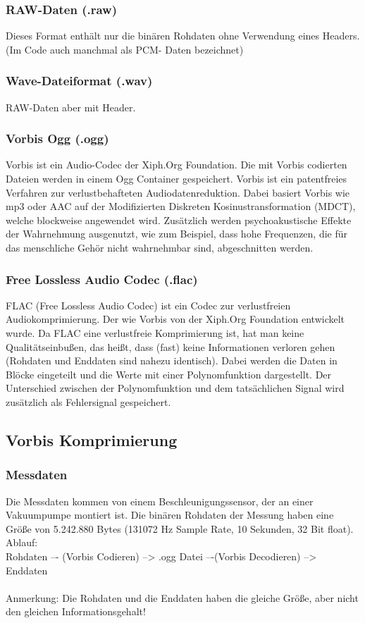 \documentclass{article}
\begin{document}
{		\subsubsection{RAW-Daten (.raw)}
			Dieses Format enthält nur die binären Rohdaten ohne Verwendung eines Headers. (Im Code auch manchmal als PCM- Daten bezeichnet)
		\subsubsection{Wave-Dateiformat (.wav)}
			RAW-Daten aber mit Header.
		\subsubsection{Vorbis Ogg (.ogg)}
			Vorbis ist ein Audio-Codec der Xiph.Org Foundation. Die mit Vorbis codierten Dateien werden in einem Ogg Container gespeichert. Vorbis ist ein patentfreies Verfahren zur verlustbehafteten Audiodatenreduktion. Dabei basiert Vorbis wie mp3 oder AAC auf der Modifizierten Diskreten Kosinustransformation (MDCT), welche blockweise angewendet wird.
			Zusätzlich werden psychoakustische Effekte der Wahrnehmung ausgenutzt, wie zum Beispiel, dass hohe Frequenzen, die für das menschliche Gehör nicht wahrnehmbar sind, abgeschnitten werden.
			
		\subsubsection{Free Lossless Audio Codec (.flac)}
			FLAC (Free Lossless Audio Codec) ist ein Codec zur verlustfreien Audiokomprimierung. Der wie Vorbis von der Xiph.Org Foundation entwickelt wurde. Da FLAC eine verlustfreie Komprimierung ist, hat man keine Qualitätseinbußen, das heißt, dass (fast) keine Informationen verloren gehen (Rohdaten und Enddaten sind nahezu identisch).
			Dabei werden die Daten in Blöcke eingeteilt und die Werte mit einer Polynomfunktion dargestellt. Der Unterschied zwischen der Polynomfunktion und dem tatsächlichen Signal wird zusätzlich als Fehlersignal gespeichert.
			
	\subsection{Vorbis Komprimierung}	
		\subsubsection{Messdaten}
			Die Messdaten kommen von einem Beschleunigungssensor, der an einer Vakuumpumpe montiert ist.
			Die binären Rohdaten der Messung haben eine Größe von 5.242.880 Bytes (131072 Hz Sample Rate, 10 Sekunden, 32 Bit float).\\
			Ablauf:\\
			Rohdaten –- (Vorbis Codieren) --> .ogg Datei –-(Vorbis Decodieren) --> Enddaten\\\\
			Anmerkung: Die Rohdaten und die Enddaten haben die gleiche Größe, aber nicht den gleichen Informationsgehalt!
			
}
\end{document}
